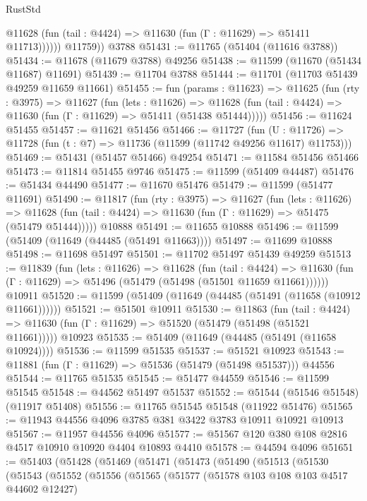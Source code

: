 \begin{lexlean}{RustStd}
\begin{coremodule}
              @11628 (fun (tail : @4424) => @11630 (fun (Γ : @11629) => @51411 @11713))))))
        @11759))
    @3788
@51431 := @11765 (@51404 (@11616 @3788))
@51434 := @11678 (@11679 @3788) @49256
@51438 := @11599 (@11670 (@51434 @11687) @11691)
@51439 := @11704 @3788
@51444 := @11701 (@11703 @51439 @49259 @11659 @11661)
@51455 := fun (params : @11623) =>
  @11625
    (fun (rty : @3975) =>
    @11627
      (fun (lets : @11626) =>
      @11628 (fun (tail : @4424) => @11630 (fun (Γ : @11629) => @51411 (@51438 @51444)))))
@51456 := @11624 @51455
@51457 := @11621 @51456
@51466 := @11727
    (fun (U : @11726) => @11728 (fun (t : @7) => @11736 (@11599 (@11742 @49256 @11617) @11753)))
@51469 := @51431 (@51457 @51466) @49254
@51471 := @11584 @51456 @51466
@51473 := @11814 @51455 @9746
@51475 := @11599 (@51409 @44487)
@51476 := @51434 @44490
@51477 := @11670 @51476
@51479 := @11599 (@51477 @11691)
@51490 := @11817
    (fun (rty : @3975) =>
    @11627
      (fun (lets : @11626) =>
      @11628 (fun (tail : @4424) => @11630 (fun (Γ : @11629) => @51475 (@51479 @51444)))))
    @10888
@51491 := @11655 @10888
@51496 := @11599 (@51409 (@11649 (@44485 (@51491 @11663))))
@51497 := @11699 @10888
@51498 := @11698 @51497
@51501 := @11702 @51497 @51439 @49259
@51513 := @11839
    (fun (lets : @11626) =>
    @11628
      (fun (tail : @4424) =>
      @11630 (fun (Γ : @11629) => @51496 (@51479 (@51498 (@51501 @11659 @11661))))))
    @10911
@51520 := @11599 (@51409 (@11649 (@44485 (@51491 (@11658 (@10912 @11661))))))
@51521 := @51501 @10911
@51530 := @11863
    (fun (tail : @4424) => @11630 (fun (Γ : @11629) => @51520 (@51479 (@51498 (@51521 @11661)))))
    @10923
@51535 := @51409 (@11649 (@44485 (@51491 (@11658 @10924))))
@51536 := @11599 @51535
@51537 := @51521 @10923
@51543 := @11881 (fun (Γ : @11629) => @51536 (@51479 (@51498 @51537))) @44556
@51544 := @11765 @51535
@51545 := @51477 @44559
@51546 := @11599 @51545
@51548 := @44562 @51497 @51537
@51552 := @51544 (@51546 @51548) (@11917 @51408)
@51556 := @11765 @51545 @51548 (@11922 @51476)
@51565 := @11943 @44556 @4096 @3785 @381 @3422 @3783 @10911 @10921 @10913
@51567 := @11957 @44556 @4096
@51577 := @51567 @120 @380 @108 @2816 @4517 @10910 @10920 @4404 @10893 @4410
@51578 := @44594 @4096
@51651 := @51403
    (@51428
      (@51469
        (@51471
          (@51473
            (@51490
              (@51513
                (@51530
                  (@51543
                    (@51552
                      (@51556
                        (@51565
                          (@51577
                            (@51578 @103 @108 @103 @4517 @44602 @12427)

\end{coremodule}
\end{lexlean}
